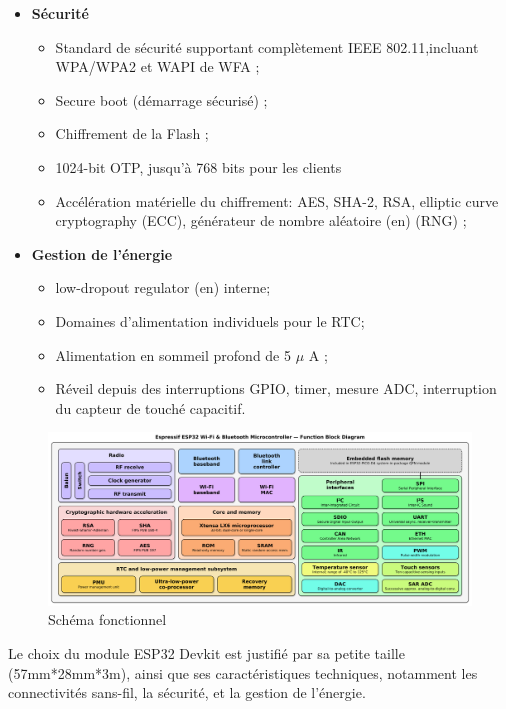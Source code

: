 \begin{itemize}
    \item[\textbullet]\textbf{Sécurité}   
        \begin{itemize}
            \item Standard de sécurité supportant complètement IEEE
                802.11,incluant WPA/WPA2 et WAPI de WFA ;
            \item Secure boot (démarrage sécurisé) ;
            \item Chiffrement de la Flash ;
            \item 1024-bit OTP, jusqu'à 768 bits pour les clients
            \item Accélération matérielle du chiffrement: AES, SHA-2, RSA,
                elliptic curve cryptography (ECC), générateur de nombre
                aléatoire (en) (RNG) ;
        \end{itemize}
    \item[\textbullet]\textbf{Gestion de l'énergie}

        \begin{itemize}
            \item low-dropout regulator (en) interne;
            \item Domaines d'alimentation individuels pour le RTC;
            \item Alimentation en sommeil profond de 5 $\mu$ A ;
            \item Réveil depuis des interruptions GPIO, timer, mesure ADC,
                interruption du capteur de touché capacitif.
        \end{itemize}
\end{itemize}


\begin{figure}[h!]
    \centering
    \includegraphics[scale=0.26 ]{images/esp32_fun.png}
    \caption{Schéma fonctionnel}
    \label{fig50}
\end{figure}

Le choix du module ESP32 Devkit est justifié par sa petite taille 
(57mm*28mm*3m), ainsi que ses caractéristiques techniques, notamment les
connectivités sans-fil, la sécurité, et la gestion de l’énergie.

